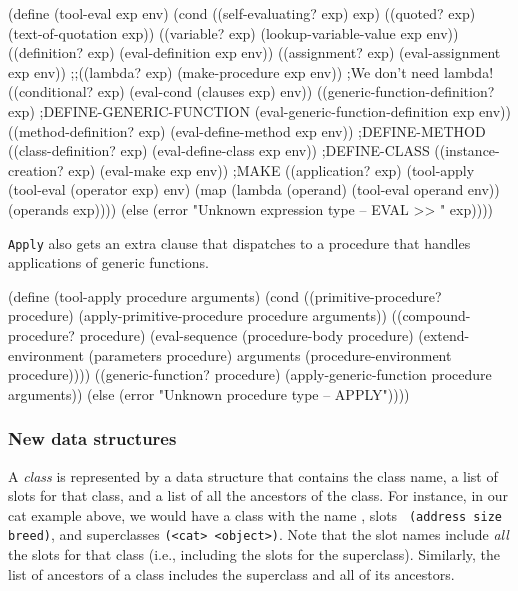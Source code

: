 \beginlisp
(define (tool-eval exp env)
  (cond ((self-evaluating? exp) exp)
        ((quoted? exp) (text-of-quotation exp))
        ((variable? exp) (lookup-variable-value exp env))
        ((definition? exp) (eval-definition exp env))
        ((assignment? exp) (eval-assignment exp env))
        ;;((lambda? exp) (make-procedure exp env))      ;We don't need lambda!
        ((conditional? exp) (eval-cond (clauses exp) env))
        ((generic-function-definition? exp)               ;DEFINE-GENERIC-FUNCTION
         (eval-generic-function-definition exp env)) 
        ((method-definition? exp) (eval-define-method exp env)) ;DEFINE-METHOD
        ((class-definition? exp) (eval-define-class exp env))     ;DEFINE-CLASS
        ((instance-creation? exp) (eval-make exp env))          ;MAKE
        ((application? exp)
         (tool-apply (tool-eval (operator exp) env)
                     (map (lambda (operand) (tool-eval operand env))
                          (operands exp))))
        (else (error "Unknown expression type -- EVAL >> " exp))))
\endlisp

{\tt Apply} also gets an extra clause that dispatches to a
procedure that handles applications of generic functions.


\beginlisp
(define (tool-apply procedure arguments)
  (cond ((primitive-procedure? procedure)
         (apply-primitive-procedure procedure arguments))
        ((compound-procedure? procedure)
         (eval-sequence
          (procedure-body procedure)
          (extend-environment (parameters procedure)
                              arguments
                              (procedure-environment procedure))))
        ((generic-function? procedure)
         (apply-generic-function procedure arguments))
        (else (error "Unknown procedure type -- APPLY"))))
\endlisp

\subsubsection{New data structures}

A {\it class} is represented by a data structure that contains the
class name, a list of slots for that class, and a list of all the
ancestors of the class.  For instance, in our cat example above, we
would have a class with the name {\tt <house-cat>}, slots {\tt
(address size breed)}, and superclasses {\tt (<cat> <object>)}.  Note
that the slot names include {\it all} the slots for that class (i.e.,
including the slots for the superclass).  Similarly, the list of
ancestors of a class includes the superclass and all of its ancestors.

